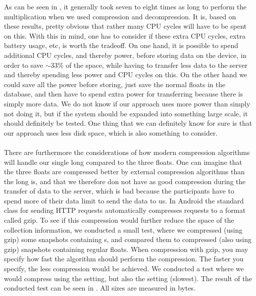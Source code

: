 As can be seen in , it generally took seven to eight times as long to perform the multiplication when we used compression and decompression. It is, based on these results, pretty obvious that rather many CPU cycles will have to be spent on this. With this in mind, one has to consider if these extra CPU cycles, extra battery usage, etc, is worth the tradeoff. On one hand, it is possible to spend additional CPU cycles, and thereby power, before storing data on the device, in order to save $\sim 33\%$ of the space, while having to transfer less data to the server and thereby spending less power and CPU cycles on this. On the other hand we could save all the power before storing, just save the normal floats in the database, and then have to spend extra power for transferring because there is simply more data. We do not know if our approach uses more power than simply not doing it, but if the system should be expanded into something large scale, it should definitely be tested. One thing that we can definitely know for sure is that our approach uses less disk space, which is also something to consider. 
\\\\
There are furthermore the considerations of how modern compression algorithms will handle our single long compared to the three floats. One can imagine that the three floats are compressed better by external compression algorithms than the long is, and that we therefore don not have as good compression during the transfer of data to the server, which is bad because the participants have to spend more of their data limit to send the data to us. In Android the standard class for sending HTTP requests automatically compresses requests to a format called gzip. To see if this compression would further reduce the space of the collection information, we conducted a small test, where we compressed (using gzip) some snapshots containing s, and compared them to compressed (also using gzip) snapshots containing regular floats. When compression with gzip, you may specify how fast the algorithm should perform the compression. The faster you specify, the less compression would be achieved. We conducted a test where we would compress using the  setting, but also the  setting (slowest). The result of the conducted test can be seen in . All sizes are measured in bytes.


